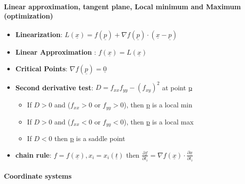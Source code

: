 \documentclass[8pt, twocolumn]{article}
\begin{document}
\paragraph{Linear approximation, tangent plane, Local minimum and Maximum (optimization)}
\begin{itemize}
			\item \textbf{Linearization}: $L(\underline{x}) = f(\underline{p}) + \nabla f(\underline{p}) \cdot (\underline{x} - \underline{p})$
			\item \textbf{Linear Approximation} : $f(\underline{x}) = L(\underline{x})$
			\item \textbf{Critical Points}: $\nabla f(\underline{p})= \underline{0}$
			\item \textbf{Second derivative test}: $D = f_{xx}f_{yy} - (f_{xy})^2$ at point \underline{p} 
				\begin{itemize}
					\item If $D > 0$ and  ($f_{xx} > 0$  or $f_{yy} > 0$), then \underline{p} is a local min
					\item If $D > 0$ and  ($f_{xx} < 0$  or $f_{yy} < 0$), then \underline{p} is a local max
					\item If $D < 0$  then \underline{p} is a saddle point
				\end{itemize} 
			\item \textbf{chain rule}: $f = f(\underline{x}) , x_i = x_i(\underline{t})$ then $\frac{\partial{f}}{\partial{t_i}} = \nabla f(\underline{x}) \cdot  \frac{\partial{\underline{x}}}{\partial{t_i}}$ 
\end{itemize} 

\paragraph{Coordinate systems}
\end{document}
